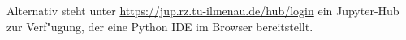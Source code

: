 \begin{center}
\begin{minipage}{0.75\textwidth}
        Alternativ steht unter \url{https://jup.rz.tu-ilmenau.de/hub/login} ein Jupyter-Hub zur Verf"ugung, der eine Python IDE im Browser bereitstellt.
    \end{minipage}
\end{center}
%
\clearpage
%
\glsresetall
\setcounter{page}{1}
